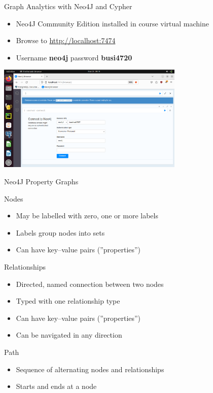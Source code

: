 \documentclass[ignorenonframetext,xcolor=x11names]{beamer}
\begin{document}
\begin{frame}{Graph Analytics with Neo4J and Cypher}
\begin{itemize}
  \item Neo4J Community Edition installed in course virtual machine
  \item Browse to \url{http://localhost:7474}
  \item Username \textbf{neo4j} password \textbf{busi4720}
\end{itemize}
\centering
\includegraphics[height=2in]{screen1.png}
\end{frame}


\begin{frame}{Neo4J Property Graphs}

\begin{block}{Nodes}
\begin{itemize}
  \item May be labelled with zero, one or more labels
  \item Labels group nodes into sets
  \item Can have key--value pairs (''properties'')
\end{itemize}
\end{block}

\begin{block}{Relationships}
\begin{itemize}
  \item Directed, named connection between two nodes
  \item Typed with one relationship type
  \item Can have key--value pairs (''properties'')
  \item Can be navigated in any direction
\end{itemize}
\end{block}

\begin{block}{Path}
\begin{itemize}
  \item Sequence of alternating nodes and relationships
  \item Starts and ends at a node
\end{itemize}
\end{block}
\end{frame}
\end{document}
